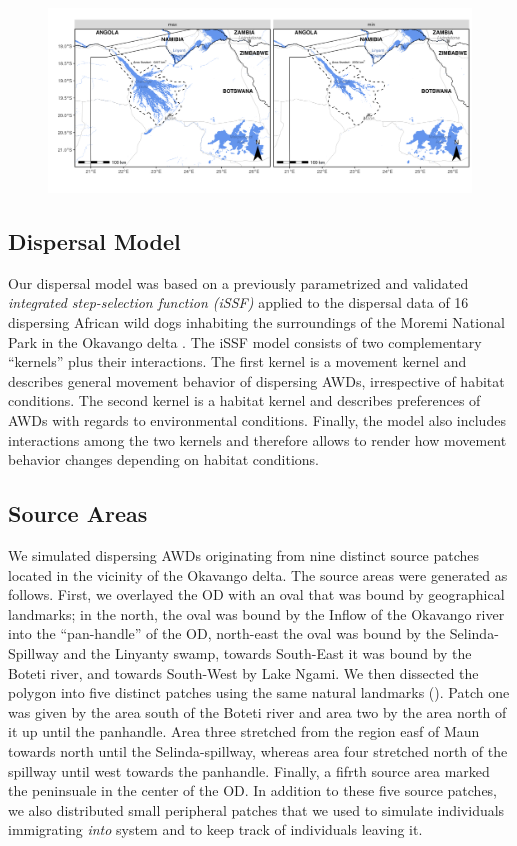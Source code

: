 \documentclass[abstract=on,10pt,a4paper,bibliography=totocnumbered]{article}
\begin{document}
\begin{figure}
  \begin{center}
  \includegraphics[width = \textwidth]{99_FloodExtent.png}
  \caption{}
  \label{FloodExtent}
  \end{center}
\end{figure}

\subsection{Dispersal Model}
Our dispersal model was based on a previously parametrized and validated
\textit{integrated step-selection function (iSSF)} applied to the dispersal data
of 16 dispersing African wild dogs inhabiting the surroundings of the Moremi
National Park in the Okavango delta \citep{Hofmann.2021}. The iSSF model
consists of two complementary ``kernels'' plus their interactions. The first
kernel is a movement kernel and describes general movement behavior of
dispersing AWDs, irrespective of habitat conditions. The second kernel is a
habitat kernel and describes preferences of AWDs with regards to environmental
conditions. Finally, the model also includes interactions among the two kernels
and therefore allows to render how movement behavior changes depending on
habitat conditions.

\subsection{Source Areas}
We simulated dispersing AWDs originating from nine distinct source patches
located in the vicinity of the Okavango delta. The source areas were generated
as follows. First, we overlayed the OD with an oval that was bound by
geographical landmarks; in the north, the oval was bound by the Inflow of the
Okavango river into the ``pan-handle'' of the OD, north-east the oval was bound
by the Selinda-Spillway and the Linyanty swamp, towards South-East it was bound
by the Boteti river, and towards South-West by Lake Ngami. We then dissected the
polygon into five distinct patches using the same natural landmarks
(). Patch one was given by the area south of the Boteti river
and area two by the area north of it up until the panhandle. Area three
stretched from the region easf of Maun towards north until the Selinda-spillway,
whereas area four stretched north of the spillway until west towards the
panhandle. Finally, a fifrth source area marked the peninsuale in the center of
the OD. In addition to these five source patches, we also distributed small
peripheral patches that we used to simulate individuals immigrating
\textit{into} system and to keep track of individuals leaving it.
\end{document}
